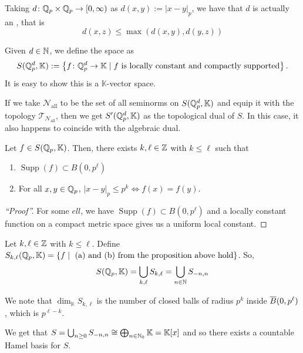 \documentclass[11pt,leqno,oneside]{amsbook}
\numberwithin{thm}{section}
\newcommand{\Top}{\mathcal{T}} %
\newcommand{\cN}{\mathcal{N}}
\newcommand{\norms}{\cN}
\newcommand{\K}{\mathbb{K}} %
\newcommand{\supp}{\operatorname{Supp}}
\begin{document}
\begin{rmk}
  Taking \(d \colon {\mathbb Q}_p \times {\mathbb Q}_p \to [0,\infty)\) as \(d(x,y) :=
  |x-y|_p\), we have that \(d\) is actually an , that
  is \[
    d(x,z) \leq \max(d(x,y), d(y,z))
  \]
\end{rmk}
\begin{defn}
  Given \(d \in {\mathbb N}\), we define the  space as \[
    S(\Q_p^d,\K) := \left\{ f \from \Q_p^d \to \K \st f \text{ is
        locally constant and compactly supported} \right\}.
  \]
  It is easy to show this is a \(\K\)-vector space.
\end{defn}
\begin{example}
  If we take \(\norms_\text{all}\) to be the set of all seminorms on
  \(S(\Q_p^d,\K)\) and equip it with the topology
  \(\Top_{\norms_\text{all}}\), then we get \(S'(\Q_p^d,\K)\) as the
  topological dual of \(S\). In this case, it also happens to coincide
  with the algebraic dual.
\end{example}
\begin{prop}
  Let \(f \in S(\Q_p,\K)\). Then, there exists \(k,\ell \in {\mathbb Z}\) with
  \(k \leq \ell\) such that
  \begin{enumerate}
  \item \(\supp(f) \subset B(0,p^\ell)\)
  \item For all \(x,y \in {\mathbb Q}_p\), \(|x-y|_p \leq p^k \iff f(x) =
    f(y)\). 
  \end{enumerate}
\end{prop}
\begin{proof}[``Proof'']
  For some \(ell\), we have \(\supp(f) \subset B(0,p^\ell)\) and a
  locally constant function on a compact metric space gives us a
  uniform local constant. 
\end{proof}
\begin{defn}
  Let \(k,\ell \in {\mathbb Z}\) with \(k \leq \ell\). Define
  \(S_{k,\ell}(\Q_p,\K) = \{f \st \text{ (a) and (b) from the 
    proposition above hold}\}\). So, \[
    S(\Q_p,\K) = \Union_{k,\ell} S_{k,\ell} = \Union_{n \in \N} S_{-n,n}
  \]
\end{defn}
We note that \(\dim_\K S_{k,\ell}\) is the number of closed balls of
radius \(p^k\) inside \(\overline{B}(0,p^\ell)\), which is \(p^{\ell-k}\).
\begin{rmk}
  We get that \(S = \Union_{n \geq 0} S_{-n,n} \isom \bigoplus_{n \in
    \N_0} \K = \K[x] \) and so there exists a countable Hamel basis
  for \(S\).
\end{rmk}
\end{document}
